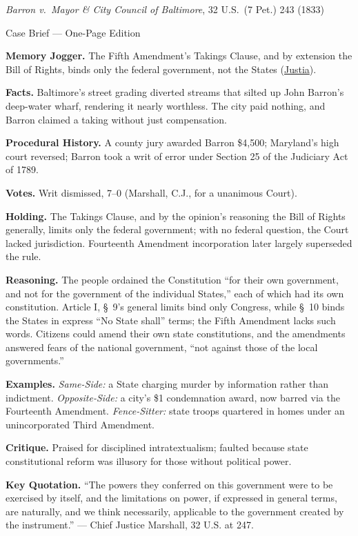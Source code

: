 \documentclass[12pt]{article}
\begin{document}
\begin{center}
{\Large \textit{Barron v.\ Mayor \& City Council of Baltimore}, 32 U.S.\ (7 Pet.) 243 (1833)\par}
\vspace{0.3em}
{\normalsize Case Brief --- One-Page Edition\par}
\end{center}

\textbf{Memory Jogger.} The Fifth Amendment's Takings Clause, and by extension the Bill of Rights, binds only the federal government, not the States (\href{https://supreme.justia.com/cases/federal/us/32/243/}{Justia}).

\textbf{Facts.} Baltimore's street grading diverted streams that silted up John Barron's deep-water wharf, rendering it nearly worthless. The city paid nothing, and Barron claimed a taking without just compensation.

\textbf{Procedural History.} A county jury awarded Barron \$4,500; Maryland's high court reversed; Barron took a writ of error under Section 25 of the Judiciary Act of 1789.

\textbf{Votes.} Writ dismissed, 7--0 (Marshall, C.J., for a unanimous Court).

\textbf{Holding.} The Takings Clause, and by the opinion's reasoning the Bill of Rights generally, limits only the federal government; with no federal question, the Court lacked jurisdiction. Fourteenth Amendment incorporation later largely superseded the rule.

\textbf{Reasoning.} The people ordained the Constitution ``for their own government, and not for the government of the individual States,'' each of which had its own constitution. Article I, \S~9's general limits bind only Congress, while \S~10 binds the States in express ``No State shall'' terms; the Fifth Amendment lacks such words. Citizens could amend their own state constitutions, and the amendments answered fears of the national government, ``not against those of the local governments.''

\textbf{Examples.} \emph{Same-Side:} a State charging murder by information rather than indictment. \emph{Opposite-Side:} a city's \$1 condemnation award, now barred via the Fourteenth Amendment. \emph{Fence-Sitter:} state troops quartered in homes under an unincorporated Third Amendment.

\textbf{Critique.} Praised for disciplined intratextualism; faulted because state constitutional reform was illusory for those without political power.

\textbf{Key Quotation.} ``The powers they conferred on this government were to be exercised by itself, and the limitations on power, if expressed in general terms, are naturally, and we think necessarily, applicable to the government created by the instrument.'' --- Chief Justice Marshall, 32 U.S. at 247.
\end{document}
